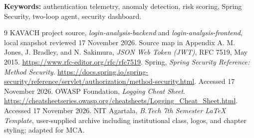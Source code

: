 \documentclass[a4paper,12pt]{nitathesis}
\numberwithin{figure}{chapter}
\begin{document}
\noindent\textbf{Keywords:} authentication telemetry, anomaly detection, risk scoring, Spring Security, two-loop agent, security dashboard.
\clearpage\begingroup\setlength{\parskip}{0pt}\tableofcontents\endgroup
\clearpage{}\pagestyle{fancy}\raggedbottom

\begin{thebibliography}{9}
 KAVACH project source, \emph{login-analysis-backend} and \emph{login-analysis-frontend}, local snapshot reviewed 17 November 2026. Source map in Appendix A.
 M. Jones, J. Bradley, and N. Sakimura, \emph{JSON Web Token (JWT)}, RFC 7519, May 2015. \url{https://www.rfc-editor.org/rfc/rfc7519}.
 Spring, \emph{Spring Security Reference: Method Security}. \url{https://docs.spring.io/spring-security/reference/servlet/authorization/method-security.html}. Accessed 17 November 2026.
 OWASP Foundation, \emph{Logging Cheat Sheet}. \url{https://cheatsheetseries.owasp.org/cheatsheets/Logging_Cheat_Sheet.html}. Accessed 17 November 2026.
 NIT Agartala, \emph{B.Tech 7th Semester LaTeX Template}, user-supplied archive including institutional class, logos, and chapter styling; adapted for MCA.
\end{thebibliography}
\appendix
\end{document}
